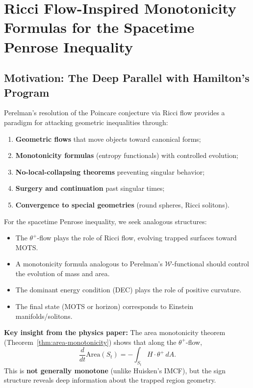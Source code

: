 \section{Ricci Flow-Inspired Monotonicity Formulas for the Spacetime Penrose Inequality}
\label{sec:RicciFlowPenrose}

\subsection{Motivation: The Deep Parallel with Hamilton's Program}

Perelman's resolution of the Poincare conjecture via Ricci flow \cite{perelman2002,perelman2003} provides a paradigm for attacking geometric inequalities through:
\begin{enumerate}[label=(\roman*)]
\item \textbf{Geometric flows} that move objects toward canonical forms;
\item \textbf{Monotonicity formulas} (entropy functionals) with controlled evolution;
\item \textbf{No-local-collapsing theorems} preventing singular behavior;
\item \textbf{Surgery and continuation} past singular times;
\item \textbf{Convergence to special geometries} (round spheres, Ricci solitons).
\end{enumerate}

For the spacetime Penrose inequality, we seek analogous structures:
\begin{itemize}
\item The $\theta^+$-flow plays the role of Ricci flow, evolving trapped surfaces toward MOTS.
\item A monotonicity formula analogous to Perelman's $\mathcal{W}$-functional should control the evolution of mass and area.
\item The dominant energy condition (DEC) plays the role of positive curvature.
\item The final state (MOTS or horizon) corresponds to Einstein manifolds/solitons.
\end{itemize}

\textbf{Key insight from the physics paper:} The area monotonicity theorem (Theorem~\ref{thm:area-monotonicity}) shows that along the $\theta^+$-flow,
\begin{equation}
\frac{d}{dt}\mathrm{Area}(S_t) = -\int_{S_t} H \cdot \theta^+ \, dA.
\label{eq:area-evo-sign}
\end{equation}
This is \textbf{not generally monotone} (unlike Huisken's IMCF), but the sign structure reveals deep information about the trapped region geometry.

